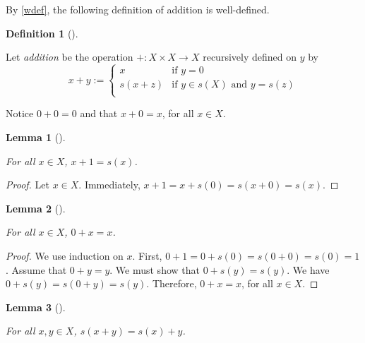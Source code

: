 \documentclass[
  letterpaper,
  10pt,
  reqno,
  twopage,
  openany]{book}
\theoremstyle{plain}
\newtheorem{lemma}{Lemma}[chapter]
\theoremstyle{definition}
\theoremstyle{definition}
\newtheorem{definition}{Definition}[chapter]
\theoremstyle{definition}
\theoremstyle{plain}
\theoremstyle{plain}
\theoremstyle{remark}
\begin{document}
By \ref{wdef}, the following definition of addition is well-defined.

\leavevmode{}%
\begin{definition}[]\label{def-}

Let \emph{addition} be the operation \(+:X\times X\to X\) recursively
defined on \(y\) by \begin{equation}
x+y:=
\begin{cases}
x & \text{if $y=0$} \\
s(x+z) & \text{if $y\in s(X)$ and $y=s(z)$} \\
\end{cases}
\end{equation}

\end{definition}

Notice \(0+0=0\) and that \(x+0=x\), for all \(x\in X\).

\leavevmode{}%
\begin{lemma}[]\label{lem-}

\label{prop1} For all \(x\in X\), \(x+1=s(x)\).

\end{lemma}

\begin{proof}

Let \(x\in X\). Immediately, \(x+1=x+s(0)=s(x+0)=s(x)\).

\end{proof}

\leavevmode{}%
\begin{lemma}[]\label{lem-}

\label{prop2} For all \(x\in X\), \(0+x=x\).

\end{lemma}

\begin{proof}

We use induction on \(x\). First, \(0+1=0+s(0)=s(0+0)=s(0)=1\). Assume
that \(0+y=y\). We must show that \(0+s(y)=s(y)\). We have
\(0+s(y)=s(0+y)=s(y)\). Therefore, \(0+x=x\), for all \(x\in X\).

\end{proof}

\leavevmode{}%
\begin{lemma}[]\label{lem-}

\label{prop3} For all \(x,y\in X\), \(s(x+y)=s(x)+y\).

\end{lemma}
\end{document}

